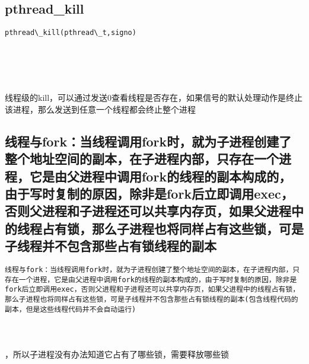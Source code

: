 \documentclass[10pt,a4paper]{article}
\begin{document}
\subsection{pthread\_kill}
\begin{spacing}{2.0}
\lstset{language=C,numbers=none}
\begin{lstlisting}
pthread\_kill(pthread\_t,signo)
\end{lstlisting}
{\large\color[rgb]{0.2,0.4,0.6}{pthread\_t:}} \\
{\large\color[rgb]{0.2,0.4,0.6}{signo:}}
\paragraph{ \ \ }线程级的kill，可以通过发送0查看线程是否存在，如果信号的默认处理动作是终止该进程，那么发送到任意一个线程都会终止整个进程
\end{spacing}

\subsection{线程与fork：当线程调用fork时，就为子进程创建了整个地址空间的副本，在子进程内部，只存在一个进程，它是由父进程中调用fork的线程的副本构成的，由于写时复制的原因，除非是fork后立即调用exec，否则父进程和子进程还可以共享内存页，如果父进程中的线程占有锁，那么子进程也将同样占有这些锁，可是子线程并不包含那些占有锁线程的副本}
\begin{spacing}{2.0}
\lstset{language=C,numbers=none}
\begin{lstlisting}
线程与fork：当线程调用fork时，就为子进程创建了整个地址空间的副本，在子进程内部，只存在一个进程，它是由父进程中调用fork的线程的副本构成的，由于写时复制的原因，除非是fork后立即调用exec，否则父进程和子进程还可以共享内存页，如果父进程中的线程占有锁，那么子进程也将同样占有这些锁，可是子线程并不包含那些占有锁线程的副本(包含线程代码的副本，但是这些线程代码并不会自动运行)
\end{lstlisting}
{\large\color[rgb]{0.2,0.4,0.6}{包含线程代码的副本，但是这些线程代码并不会自动运行:}}
\paragraph{ \ \ }，所以子进程没有办法知道它占有了哪些锁，需要释放哪些锁
\end{spacing}
\end{document}
